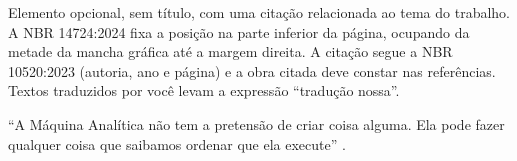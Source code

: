 \begin{epigrafe}
\begin{instrucao}
Elemento opcional, sem título, com uma citação relacionada ao tema do
trabalho. A NBR 14724:2024 fixa a posição na parte inferior da página, ocupando
da metade da mancha gráfica até a margem direita. A citação segue a NBR
10520:2023 (autoria, ano e página) e a obra citada deve constar nas
referências. Textos traduzidos por você levam a expressão ``tradução nossa''.
\end{instrucao}
\vspace*{\fill}
\hfill
\begin{minipage}{.5\textwidth}
  \SingleSpacing
  ``A Máquina Analítica não tem a pretensão de criar coisa alguma. Ela pode
  fazer qualquer coisa que saibamos ordenar que ela execute''
  \cite[p.~722, tradução nossa]{lovelace1843sketch}.
\end{minipage}
\end{epigrafe}
